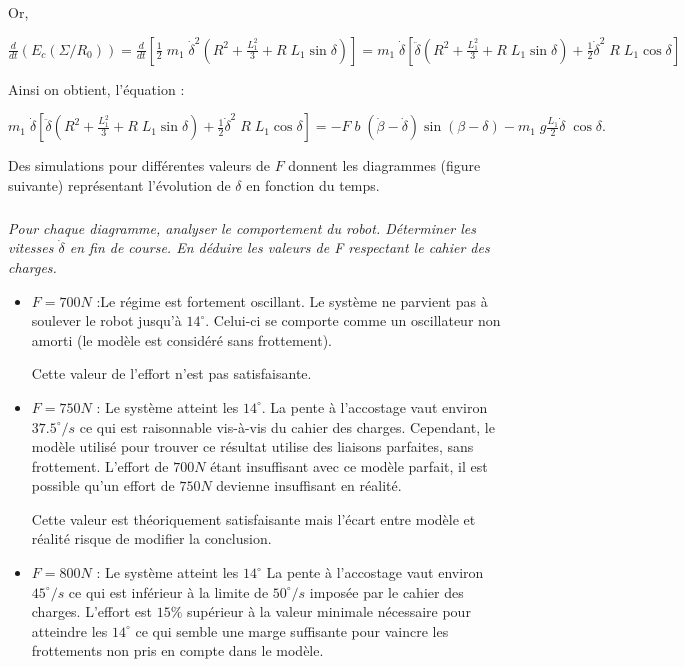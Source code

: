 \begin{multicols}{2}
\begin{corrige}
Or, 

$
\frac{d}{dt}(E_c(\Sigma/R_0))=\frac{d}{dt}\left[\frac{1}{2}\;m_1\;\dot{\delta}^2\left(R^2+\frac{L_1^2}{3}+R\;L_1\sin\delta\right)\right]
=m_1\;\dot{\delta}\left[\ddot{\delta}\left(R^2+\frac{L_1^2}{3}+R\;L_1\sin\delta\right)+\frac{1}{2}\dot{\delta}^2\;R\;L_1\cos\delta\right]
$


Ainsi on obtient, l'équation :

$
\boxed{
m_1\;\dot{\delta}\left[\ddot{\delta}\left(R^2+\frac{L_1^2}{3}+R\;L_1\sin\delta\right)+\frac{1}{2}\dot{\delta}^2\;R\;L_1\cos\delta\right]
=-F\;b\;\left(\dot{\beta}-\dot{\delta}\right)\sin(\beta-\delta)-m_1\;g\frac{L_1}{2}\dot{\delta}\;\cos\delta.
}
$

\end{corrige}
\else
\fi


Des simulations pour différentes valeurs de $F$ donnent les diagrammes (figure suivante) représentant l'évolution de $\delta$ en fonction du temps.

\subparagraph{}
\textit{Pour chaque diagramme, analyser le comportement du robot. Déterminer les vitesses $\dot{\delta}$ en fin de course. En déduire les valeurs de F respectant le cahier des charges.}
\ifprof
\begin{corrige}
\begin{itemize}
\item \textbf{$F=700N$} :Le régime est fortement oscillant. Le système ne parvient pas à soulever
le robot jusqu'à $14^{\circ}$. Celui-ci se comporte comme un oscillateur non
amorti (le modèle est considéré sans frottement).

Cette valeur de l'effort n'est pas satisfaisante.

\item \textbf{$F=750N$} : Le système atteint les $14^{\circ}$. La pente à l'accostage vaut environ $37.5^{\circ}/s$
ce qui est raisonnable vis-à-vis du cahier des charges. Cependant, le
modèle utilisé pour trouver ce résultat utilise des liaisons parfaites,
sans frottement. L'effort de $700N$ étant insuffisant avec ce modèle
parfait, il est possible qu'un effort de $750N$ devienne insuffisant en
réalité.

Cette valeur est théoriquement satisfaisante mais l'écart entre modèle
et réalité risque de modifier la conclusion.

\item \textbf{$F=800N$} : Le système atteint les $14^{\circ}$ La pente à l'accostage vaut environ $45^{\circ}/s$ ce
qui est inférieur à la limite de $50^{\circ}/s$ imposée par le cahier des
charges. L'effort est $15\%$ supérieur à la valeur minimale nécessaire
pour atteindre les $14^{\circ}$ ce qui semble une marge suffisante pour vaincre
les frottements non pris en compte dans le modèle.


\end{itemize}
\end{corrige}
\end{multicols}
